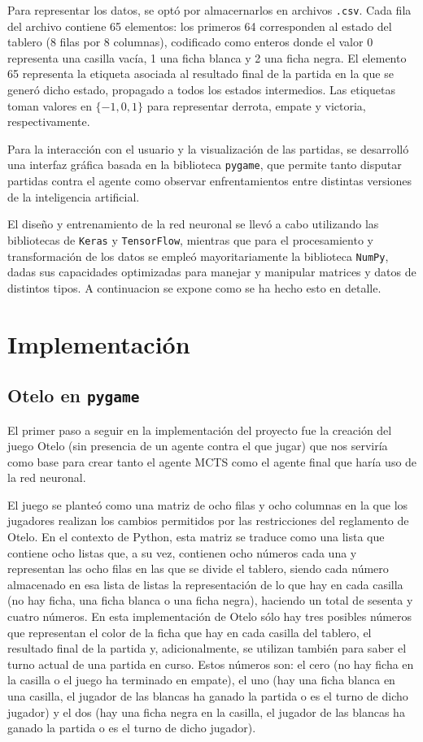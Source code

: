 \documentclass[conference]{IEEEtran}
\begin{document}
Para representar los datos, se optó por almacernarlos en archivos \texttt{.csv}. Cada fila del archivo contiene 65 elementos: los primeros 64 corresponden al estado del tablero (8 filas por 8 columnas), codificado como enteros donde el valor 0 representa una casilla vacía, 1 una ficha blanca y 2 una ficha negra. El elemento 65 representa la etiqueta asociada al resultado final de la partida en la que se generó dicho estado, propagado a todos los estados intermedios. Las etiquetas toman valores en $\{-1, 0, 1\}$ para representar derrota, empate y victoria, respectivamente.

Para la interacción con el usuario y la visualización de las partidas, se desarrolló una interfaz gráfica basada en la biblioteca \texttt{pygame}, que permite tanto disputar partidas contra el agente como observar enfrentamientos entre distintas versiones de la inteligencia artificial.

El diseño y entrenamiento de la red neuronal se llevó a cabo utilizando las bibliotecas de \texttt{Keras} y \texttt{TensorFlow}, mientras que para el procesamiento y transformación de los datos se empleó mayoritariamente la biblioteca \texttt{NumPy}, dadas sus capacidades optimizadas para manejar y manipular matrices y datos de distintos tipos.
A continuacion se expone como se ha hecho esto en detalle.

\section{Implementación}


\subsection{Otelo en \texttt{pygame}}
El primer paso a seguir en la implementación del proyecto fue la creación del juego Otelo (sin presencia de un agente contra el que jugar) que nos serviría como base para crear tanto el agente MCTS como el agente final que haría uso de la red neuronal.

El juego se planteó como una matriz de ocho filas y ocho columnas en la que los jugadores realizan los cambios permitidos por las restricciones del reglamento de Otelo. En el contexto de Python, esta matriz se traduce como una lista que contiene ocho listas que, a su vez, contienen ocho números cada una y representan las ocho filas en las que se divide el tablero, siendo cada número almacenado en esa lista de listas la representación de lo que hay en cada casilla (no hay ficha, una ficha blanca o una ficha negra), haciendo un total de sesenta y cuatro números. En esta implementación de Otelo sólo hay tres posibles números que representan el color de la ficha que hay en cada casilla del tablero, el resultado final de la partida y, adicionalmente, se utilizan también para saber el turno actual de una partida en curso. Estos números son: el cero (no hay ficha en la casilla o el juego ha terminado en empate), el uno (hay una ficha blanca en una casilla, el jugador de las blancas ha ganado la partida o es el turno de dicho jugador) y el dos (hay una ficha negra en la casilla, el jugador de las blancas ha ganado la partida o es el turno de dicho jugador).
\end{document}
